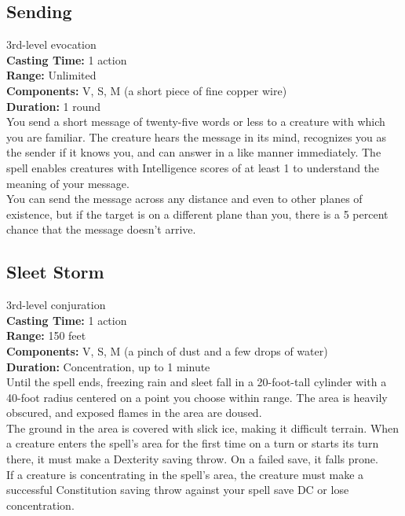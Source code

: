 \documentclass[11pt, A4paper, english]{article}
\begin{document}
		\subsection{Sending}
3rd-level evocation \\
\textbf{Casting Time:} 1 action \\
\textbf{Range:} Unlimited \\
\textbf{Components:} V, S, M (a short piece of fine copper wire) \\
\textbf{Duration:} 1 round \\
You send a short message of twenty-five words or less to a creature with which you are familiar. The creature hears the message in its mind, recognizes you as the sender if it knows you, and can answer in a like manner immediately. The spell enables creatures with Intelligence scores of at least 1 to understand the meaning of your message. \\
You can send the message across any distance and even to other planes of existence, but if the target is on a different plane than you, there is a 5 percent chance that the message doesn’t arrive.

		\subsection{Sleet Storm}
3rd-level conjuration \\
\textbf{Casting Time:} 1 action \\
\textbf{Range:} 150 feet \\
\textbf{Components:} V, S, M (a pinch of dust and a few drops of water) \\
\textbf{Duration:} Concentration, up to 1 minute \\
Until the spell ends, freezing rain and sleet fall in a 20-foot-tall cylinder with a 40-foot radius centered on a point you choose within range. The area is heavily obscured, and exposed flames in the area are doused. \\
The ground in the area is covered with slick ice, making it difficult terrain. When a creature enters the spell’s area for the first time on a turn or starts its turn there, it must make a Dexterity saving throw. On a failed save, it falls prone. \\
If a creature is concentrating in the spell’s area, the creature must make a successful Constitution saving throw against your spell save DC or lose concentration.
\end{document}
